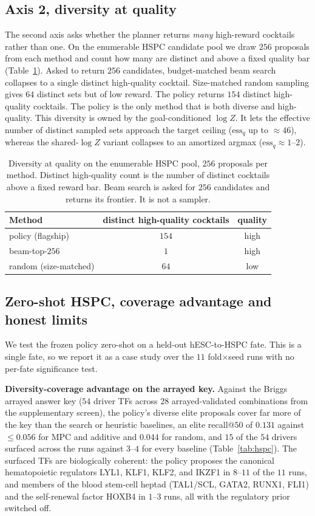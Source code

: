 \subsection{Axis 2, diversity at quality}
The second axis asks whether the planner returns \emph{many} high-reward cocktails rather than
one. On the enumerable HSPC candidate pool we draw $256$ proposals from each method and count
how many are distinct and above a fixed quality bar (Table~\ref{tab:diversity}). Asked to
return $256$ candidates, budget-matched beam search collapses to a single distinct high-quality
cocktail. Size-matched random sampling gives $64$ distinct sets but of low reward. The policy
returns $154$ distinct high-quality cocktails. The policy is the only method that is both
diverse and high-quality. This diversity is owned by the goal-conditioned $\log Z$. It lets
the effective number of distinct sampled sets approach the target ceiling ($\mathrm{ess}_q$ up
to $\approx46$), whereas the shared-$\log Z$ variant collapses to an amortized argmax
($\mathrm{ess}_q\approx1$--$2$).

\begin{table}[h]\centering\footnotesize
\caption{Diversity at quality on the enumerable HSPC pool, $256$ proposals per method.
Distinct high-quality count is the number of distinct cocktails above a fixed reward bar.
Beam search is asked for $256$ candidates and returns its frontier. It is not a sampler.}
\label{tab:diversity}
\begin{tabular}{@{}lcc@{}}
\toprule
Method & distinct high-quality cocktails & quality \\
\midrule
policy (flagship)      & $154$ & high \\
beam-top-$256$         & $1$   & high \\
random (size-matched)  & $64$  & low  \\
\bottomrule
\end{tabular}
\end{table}

\subsection{Zero-shot HSPC, coverage advantage and honest limits}
We test the frozen policy zero-shot on a held-out hESC-to-HSPC fate. This is a single fate, so we
report it as a case study over the $11$ fold$\times$seed runs with no per-fate significance test.

\textbf{Diversity-coverage advantage on the arrayed key.} Against the Briggs arrayed answer key
($54$ driver TFs across $28$ arrayed-validated combinations from the supplementary screen),
the policy's diverse elite proposals cover far more of the key than the search or heuristic
baselines, an elite recall@$50$ of $0.131$ against $\le0.056$ for MPC and additive and $0.044$ for
random, and $15$ of the $54$ drivers surfaced across the runs against $3$--$4$ for every baseline
(Table~\ref{tab:hspc}). The surfaced TFs are biologically coherent: the policy proposes the
canonical hematopoietic regulators LYL1, KLF1, KLF2, and IKZF1 in $8$--$11$ of the $11$ runs, and
members of the blood stem-cell heptad (TAL1/SCL, GATA2, RUNX1, FLI1) and the self-renewal factor
HOXB4 in $1$--$3$ runs, all with the regulatory prior switched off.

